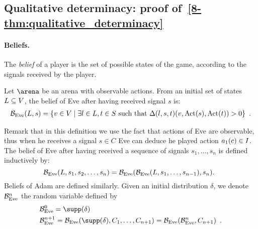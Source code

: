 \subsection{Qualitative determinacy: proof of~\cref{8-thm:qualitative_determinacy}}

\paragraph{Beliefs.}
The
\emph{belief} of a player
is the set of possible states of the game, according
to the signals received by the player. 

\begin{definition}[Belief]
{Let $\arena$ be an arena with observable actions.}
  From an initial set of states $L\subseteq V$, the belief of
  Eve after having received signal $s$ is:
  \begin{multline*}
\mathcal{B}_{\text{Eve}}(L,s) =
 \{ v\in V \mid \exists l\in L, t\in S \text{ such that } \Delta(l,s,t)(v,\text{Act}(s),\text{Act}(t))>0\}\enspace.  
  \end{multline*}

Remark that in this definition we use the fact that actions of Eve are observable,
thus when he receives a signal $s\in C$ Eve can deduce he played action
$a_1(c)\in I$.
The belief of Eve after having received a sequence of signals $s_1,\ldots,s_n$ is defined inductively by:
\[
\mathcal{B}_{\text{Eve}}(L,s_1,s_2,\ldots,s_n)
 = \mathcal{B}_{\text{Eve}}(\mathcal{B}_{\text{Eve}}(L,s_1,\ldots,s_{n-1}),s_n).\enspace
\]
Beliefs of Adam are defined similarly.
{
Given an initial distribution $\delta$,
we denote
$\mathcal{B}_{\text{Eve}}^n$ the random variable defined by}
\begin{align*}
&{\belun^{0} = \supp(\delta)}\\
&{\belun^{n+1} =\belun(\supp(\delta),C_1,\ldots,C_{n+1})
= \belun(\belun^n,C_{n+1})
\enspace.}
\end{align*}
\end{definition}



